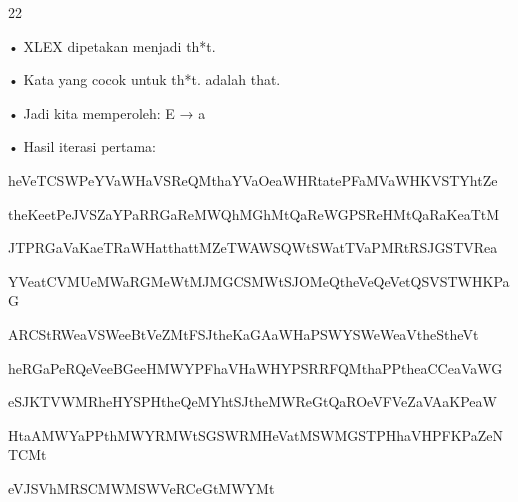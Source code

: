 \documentclass{article}
\begin{document}

22

• XLEX dipetakan menjadi th*t. 

• Kata yang cocok untuk th*t. adalah that. 

• Jadi kita memperoleh: E → a

• Hasil iterasi pertama:

 heVeTCSWPeYVaWHaVSReQMthaYVaOeaWHRtatePFaMVaWHKVSTYhtZe

theKeetPeJVSZaYPaRRGaReMWQhMGhMtQaReWGPSReHMtQaRaKeaTtM

JTPRGaVaKaeTRaWHatthattMZeTWAWSQWtSWatTVaPMRtRSJGSTVRea

YVeatCVMUeMWaRGMeWtMJMGCSMWtSJOMeQtheVeQeVetQSVSTWHKPaG

ARCStRWeaVSWeeBtVeZMtFSJtheKaGAaWHaPSWYSWeWeaVtheStheVt

heRGaPeRQeVeeBGeeHMWYPFhaVHaWHYPSRRFQMthaPPtheaCCeaVaWG

eSJKTVWMRheHYSPHtheQeMYhtSJtheMWReGtQaROeVFVeZaVAaKPeaW

HtaAMWYaPPthMWYRMWtSGSWRMHeVatMSWMGSTPHhaVHPFKPaZeNTCMt

eVJSVhMRSCMWMSWVeRCeGtMWYMt
\end{document}
